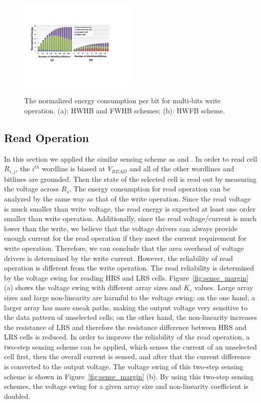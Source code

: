 \begin{figure}%
\centering
  \includegraphics[width=0.5\textwidth]{./figures/multi_energy_f.pdf}\\
  \caption{The normalized energy consumption per bit for multi-bits write operation. (a): HWHB and  FWHB schemes; (b): HWFB scheme. }\label{fig:multi_energy}
    \vspace{-10pt}
\end{figure}


\subsection{Read Operation}
In this section we applied the similar sensing scheme as
\cite{crossbar_TED_2010} and \cite{crossbar_NANO08_Flocke}. In order to
read cell $R_{i,j}$, the $i^{th}$ wordline is biased at $V_{READ}$ and all
of the other wordlines and bitlines are grounded. Then the state of the
selected cell is read out by measuring the voltage across $R_s$. The
energy consumption for read operation can be analyzed by the same way as
that of the write operation. Since the read voltage is much smaller than
write voltage, the read energy is expected at least one order smaller than
write operation. Additionally, since the read voltage/current is much
lower than the write, we believe that the voltage drivers can always
provide enough current for the read operation if they meet the current
requirement for write operation. Therefore, we can conclude that the area
overhead of voltage drivers is determined by the write current. However,
the reliability of read operation is different from the write operation.
The read reliability is determined by the voltage swing for reading HRS
and LRS cells. Figure~\ref{fig:sense_margin} (a) shows the voltage swing
with different array sizes and $K_r$ values. Large array sizes and large
non-linearity are harmful to the voltage swing: on the one hand, a larger
array has more sneak paths, making the output voltage very sensitive to
the data pattern of unselected cells; on the other hand, the non-linearity
increases the resistance of LRS and therefore the resistance difference
between HRS and LRS cells is reduced. In order to improve the reliability
of the read operation, a two-step sensing scheme can be applied, which
senses the current of an unselected cell first, then the overall current
is sensed, and after that the current difference is converted to the
output voltage. The voltage swing of this two-step sensing scheme is shown
in Figure~\ref{fig:sense_margin} (b). By using this two-step sensing
schemes, the voltage swing for a given array size and non-linearity
coefficient is doubled.



